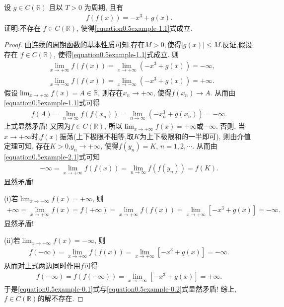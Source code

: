 \documentclass[../../main.tex]{subfiles}%
\begin{document}
\begin{example}
设 \(g\in C(\mathbb{R})\) 且以 \(T > 0\) 为周期, 且有
\begin{align}
f(f(x))=-x^3 + g(x).\label{equation0.5example-1.1}
\end{align}
证明:不存在 \(f\in C(\mathbb{R})\), 使得\eqref{equation0.5example-1.1}式成立. 
\end{example}
\begin{proof}

由\hyperref[proposition:连续的周期函数的基本性质]{连续的周期函数的基本性质}可知,存在$M>0,$使得$|g(x)|\leqslant M.$反证,假设存在 \(f\in C(\mathbb{R})\), 使得\eqref{equation0.5example-1.1}式成立. 则
\begin{align}
&\underset{x\rightarrow +\infty}{\lim}f\left( f\left( x \right) \right) =\underset{x\rightarrow +\infty}{\lim}\left( -x^3+g\left( x \right) \right) =-\infty ,\label{equation0.5example-2.1}
\\
&\underset{x\rightarrow -\infty}{\lim}f\left( f\left( x \right) \right) =\underset{x\rightarrow -\infty}{\lim}\left( -x^3+g\left( x \right) \right) =+\infty .\label{equation0.5example-2.2}
\end{align}
假设\(\lim_{x\rightarrow +\infty}f(x) = A\in \mathbb{R}\), 则存在\(x_n\rightarrow +\infty\), 使得\(f(x_n)\rightarrow A\). 从而由\eqref{equation0.5example-1.1}式可得
\begin{align*}
f(A) = \lim_{n\rightarrow \infty}f(f(x_n)) = \lim_{n\rightarrow \infty}(-x_{n}^{3}+g(x_n)) = -\infty.
\end{align*}
上式显然矛盾! 又因为\(f\in C(\mathbb{R})\), 所以\(\lim_{x\rightarrow +\infty}f(x) = +\infty\)或\(-\infty\).
否则, 当\(x\rightarrow +\infty\)时,\(f(x)\)振荡(上下极限不相等,取$K$为上下极限和的一半即可), 则由介值定理可知, 存在$K>0$,\(y_n\rightarrow +\infty\), 使得\(f(y_n) = K\), \(n = 1,2,\cdots\).
从而由\eqref{equation0.5example-2.1}式可知
\begin{align*}
-\infty = \lim_{x\rightarrow +\infty}f(f(x)) = \lim_{n\rightarrow \infty}f(f(y_n)) = f(K).
\end{align*}
显然矛盾!

(i)若\(\lim_{x\rightarrow +\infty}f(x) = +\infty\), 则
\begin{align*}
+\infty = \lim_{x\rightarrow +\infty}f(x) = f(+\infty) = \lim_{x\rightarrow +\infty}f(f(x)) = \lim_{x\rightarrow +\infty}[-x^3 + g(x)] = -\infty.
\end{align*}
显然矛盾!

(ii)若\(\lim_{x\rightarrow +\infty}f(x) = -\infty\), 则
\begin{align}
f(-\infty) = \lim_{x\rightarrow +\infty}f(f(x)) = \lim_{x\rightarrow +\infty}[-x^3 + g(x)] = -\infty. \label{equation0.5example-0.1}
\end{align}
从而对上式两边同时作用\(f\)可得
\begin{align}
f(-\infty) = f(f(-\infty)) = \lim_{x\rightarrow -\infty}[-x^3 + g(x)] = +\infty. \label{equation0.5example-0.2}
\end{align}
于是\eqref{equation0.5example-0.1}式与\eqref{equation0.5example-0.2}式显然矛盾!
综上,\(f\in C(\mathbb{R})\)的解不存在. 

\end{proof}
\end{document}
